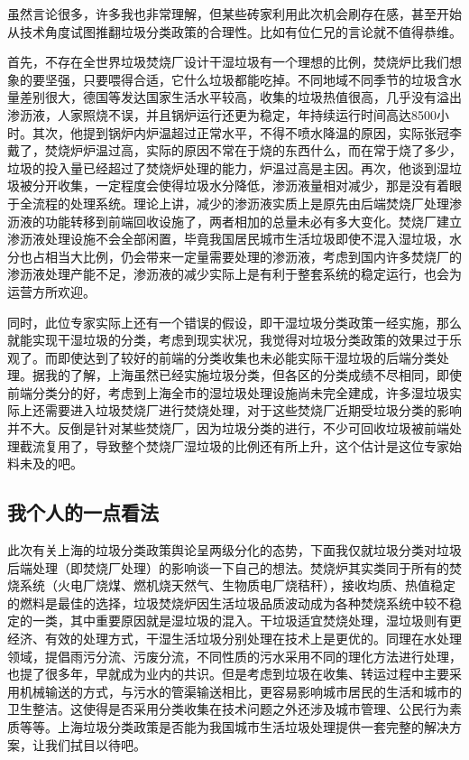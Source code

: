 \documentclass[
]{book}
\begin{document}
虽然言论很多，许多我也非常理解，但某些砖家利用此次机会刷存在感，甚至开始从技术角度试图推翻垃圾分类政策的合理性。比如有位仁兄的言论就不值得恭维。

首先，不存在全世界垃圾焚烧厂设计干湿垃圾有一个理想的比例，焚烧炉比我们想象的要坚强，只要喂得合适，它什么垃圾都能吃掉。不同地域不同季节的垃圾含水量差别很大，德国等发达国家生活水平较高，收集的垃圾热值很高，几乎没有溢出渗沥液，人家照烧不误，并且锅炉运行还更为稳定，年持续运行时间高达8500小时。其次，他提到锅炉内炉温超过正常水平，不得不喷水降温的原因，实际张冠李戴了，焚烧炉炉温过高，实际的原因不常在于烧的东西什么，而在常于烧了多少，垃圾的投入量已经超过了焚烧炉处理的能力，炉温过高是主因。再次，他谈到湿垃圾被分开收集，一定程度会使得垃圾水分降低，渗沥液量相对减少，那是没有着眼于全流程的处理系统。理论上讲，减少的渗沥液实质上是原先由后端焚烧厂处理渗沥液的功能转移到前端回收设施了，两者相加的总量未必有多大变化。焚烧厂建立渗沥液处理设施不会全部闲置，毕竟我国居民城市生活垃圾即使不混入湿垃圾，水分也占相当大比例，仍会带来一定量需要处理的渗沥液，考虑到国内许多焚烧厂的渗沥液处理产能不足，渗沥液的减少实际上是有利于整套系统的稳定运行，也会为运营方所欢迎。

同时，此位专家实际上还有一个错误的假设，即干湿垃圾分类政策一经实施，那么就能实现干湿垃圾的分类，考虑到现实状况，我觉得对垃圾分类政策的效果过于乐观了。而即使达到了较好的前端的分类收集也未必能实际干湿垃圾的后端分类处理。据我的了解，上海虽然已经实施垃圾分类，但各区的分类成绩不尽相同，即使前端分类分的好，考虑到上海全市的湿垃圾处理设施尚未完全建成，许多湿垃圾实际上还需要进入垃圾焚烧厂进行焚烧处理，对于这些焚烧厂近期受垃圾分类的影响并不大。反倒是针对某些焚烧厂，因为垃圾分类的进行，不少可回收垃圾被前端处理截流复用了，导致整个焚烧厂湿垃圾的比例还有所上升，这个估计是这位专家始料未及的吧。

\hypertarget{ux6211ux4e2aux4ebaux7684ux4e00ux70b9ux770bux6cd5}{%
\subsection{我个人的一点看法}\label{ux6211ux4e2aux4ebaux7684ux4e00ux70b9ux770bux6cd5}}

此次有关上海的垃圾分类政策舆论呈两级分化的态势，下面我仅就垃圾分类对垃圾后端处理（即焚烧厂处理）的影响谈一下自己的想法。焚烧炉其实类同于所有的焚烧系统（火电厂烧煤、燃机烧天然气、生物质电厂烧秸秆），接收均质、热值稳定的燃料是最佳的选择，垃圾焚烧炉因生活垃圾品质波动成为各种焚烧系统中较不稳定的一类，其中重要原因就是湿垃圾的混入。干垃圾适宜焚烧处理，湿垃圾则有更经济、有效的处理方式，干湿生活垃圾分别处理在技术上是更优的。同理在水处理领域，提倡雨污分流、污废分流，不同性质的污水采用不同的理化方法进行处理，也提了很多年，早就成为业内的共识。但是考虑到垃圾在收集、转运过程中主要采用机械输送的方式，与污水的管渠输送相比，更容易影响城市居民的生活和城市的卫生整洁。这使得是否采用分类收集在技术问题之外还涉及城市管理、公民行为素质等等。上海垃圾分类政策是否能为我国城市生活垃圾处理提供一套完整的解决方案，让我们拭目以待吧。
\end{document}
